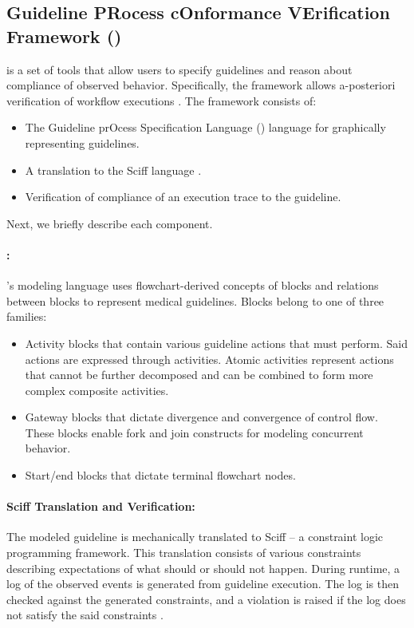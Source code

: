 \subsection{Guideline PRocess cOnformance VErification Framework (\GPROVE{})}\label{sec:gprove}

\GPROVE{} is a set of tools that allow users to specify guidelines and
reason about compliance of observed behavior. Specifically,
the framework allows a-posteriori verification of workflow executions \cite{ChesaniISMIS06}.
The \GPROVE{} framework consists of:
\begin{itemize}
  \item The Guideline prOcess Specification Language (\GOSPEL{}) language for graphically representing guidelines.
  \item A translation to the Sciff language \cite{AlbertiTOCL08}.
  \item Verification of compliance of an execution trace to the guideline.
\end{itemize}
Next, we briefly describe each component.

\paragraph{\GOSPEL{}:}

\GPROVE{}'s modeling language uses flowchart-derived concepts of
blocks and relations between blocks to represent medical guidelines. Blocks belong to one of three families:
\begin{itemize}
  \item Activity blocks that contain various guideline actions that \HCPs{} must perform.
    Said actions are expressed through activities.
    Atomic activities represent actions that cannot be further decomposed and
    can be combined to form more complex composite activities.
  \item Gateway blocks that dictate divergence and convergence of control flow.
    These blocks enable fork and join constructs for modeling concurrent
    behavior.
  \item Start/end blocks that dictate terminal flowchart nodes.
\end{itemize}

\paragraph{Sciff Translation and Verification:}

The modeled guideline is mechanically translated to Sciff --
a constraint logic programming framework. This translation
consists of various constraints describing expectations of what
should or should not happen. During runtime,
a log of the observed events is generated from guideline execution.
The log is then checked against the generated constraints, and a violation is
raised if the log does not satisfy the said constraints \cite{ChesaniBook08}.

